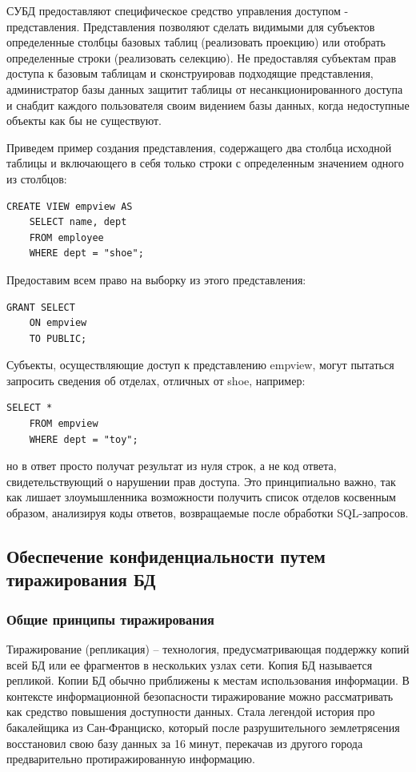 СУБД предоставляют специфическое средство управления доступом - представления. Представления
позволяют сделать видимыми для субъектов определенные столбцы базовых таблиц (реализовать проекцию)
или отобрать определенные строки (реализовать селекцию). Не предоставляя субъектам прав доступа к
базовым таблицам и сконструировав подходящие представления, администратор базы данных защитит
таблицы от несанкционированного доступа и снабдит каждого пользователя своим видением базы данных,
когда недоступные объекты как бы не существуют.

Приведем пример создания представления, содержащего два столбца исходной таблицы и включающего в
себя только строки с определенным значением одного из столбцов:
\begin{lstlisting}[]
    CREATE VIEW empview AS
    SELECT name, dept
    FROM employee
    WHERE dept = "shoe";
\end{lstlisting}

Предоставим всем право на выборку из этого представления:
\begin{lstlisting}[]
    GRANT SELECT
    ON empview
    TO PUBLIC;
\end{lstlisting}

Субъекты, осуществляющие доступ к представлению empview, могут пытаться запросить сведения об
отделах, отличных от shoe, например:
\begin{lstlisting}[]
    SELECT *
    FROM empview
    WHERE dept = "toy";
\end{lstlisting}

но в ответ просто получат результат из нуля строк, а не код ответа, свидетельствующий о нарушении
прав доступа. Это принципиально важно, так как лишает злоумышленника возможности получить список
отделов косвенным образом, анализируя коды ответов, возвращаемые после обработки SQL-запросов.


\subsection{Обеспечение конфиденциальности путем тиражирования БД}

\subsubsection{Общие принципы тиражирования}

Тиражирование (репликация) – технология, предусматривающая поддержку
копий всей БД или ее фрагментов в нескольких узлах сети. Копия БД называется
репликой. Копии БД обычно приближены к местам использования информации.
В контексте информационной безопасности тиражирование можно рассматривать как средство повышения
доступности данных. Стала легендой история про бакалейщика из Сан-Франциско, который после
разрушительного землетрясения восстановил свою базу данных за 16 минут, перекачав из другого
города предварительно протиражированную информацию.

